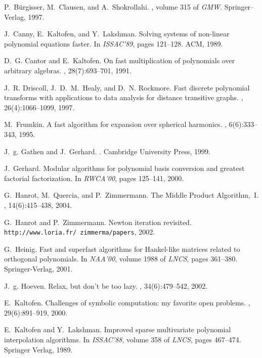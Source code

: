 \documentclass{sig-alternate}
\begin{document}
\begin{thebibliography}{10}
P.~B{\"u}rgisser, M.~Clausen, and A.~Shokrollahi.
, volume 315 of {\em GMW}.
\newblock Springer--Verlag, 1997.

J.~Canny, E.~Kaltofen, and Y.~Lakshman.
\newblock Solving systems of non-linear polynomial equations faster.
\newblock In {\em ISSAC'89}, pages 121--128. ACM, 1989.

D.~G. Cantor and E.~Kaltofen.
\newblock On fast multiplication of polynomials over arbitrary algebras.
, 28(7):693--701, 1991.

J.~R. Driscoll, J.~D.~M.~Healy, and D.~N. Rockmore.
\newblock Fast discrete polynomial transforms with applications to data
  analysis for distance transitive graphs.
, 26(4):1066--1099, 1997.

M.~Frumkin.
\newblock A fast algorithm for expansion over spherical harmonics.
, 6(6):333--343, 1995.

J.~g. Gathen and J.~Gerhard.
.
\newblock Cambridge University Press, 1999.

J.~Gerhard.
\newblock Modular algorithms for polynomial basis conversion and greatest
  factorial factorization.
\newblock In {\em RWCA'00}, pages 125--141, 2000.

G.~Hanrot, M.~Quercia, and P.~Zimmermann.
\newblock The {M}iddle {P}roduct {A}lgorithm,~{I}.
, 14(6):415--438, 2004.

G.~Hanrot and P.~Zimmermann.
\newblock Newton iteration revisited.
\newblock \texttt{http://www.loria.fr/~zimmerma/papers}, 2002.

G.~Heinig.
\newblock Fast and superfast algorithms for {H}ankel-like matrices related to
  orthogonal polynomials.
\newblock In {\em NAA'00}, volume 1988 of {\em LNCS}, pages 361--380.
  Springer-Verlag, 2001.

J.~g. Hoeven.
\newblock Relax, but don't be too lazy.
, 34(6):479--542, 2002.

E.~Kaltofen.
\newblock Challenges of symbolic computation: my favorite open problems.
, 29(6):891--919, 2000.

E.~Kaltofen and Y.~Lakshman.
\newblock Improved sparse multivariate polynomial interpolation algorithms.
\newblock In {\em ISSAC'88}, volume 358 of {\em LNCS}, pages 467--474. Springer
  Verlag, 1989.


\end{thebibliography}
\end{document}
